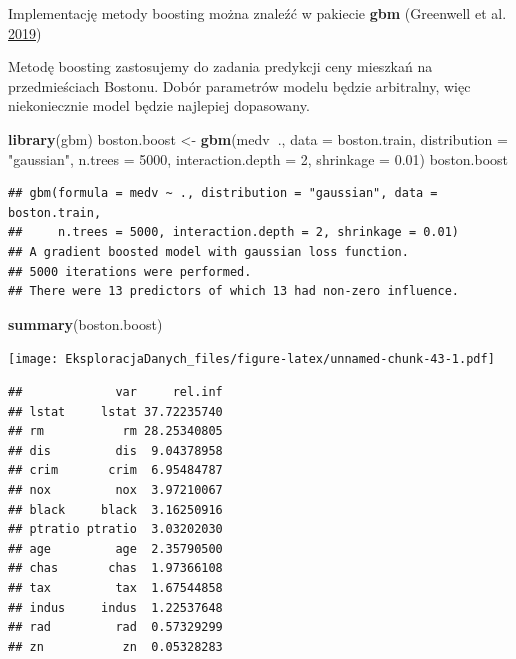 \documentclass[]{book}
\newenvironment{Shaded}{\begin{snugshade}}{\end{snugshade}}
\newcommand{\DataTypeTok}[1]{\textcolor[rgb]{0.13,0.29,0.53}{#1}}
\newcommand{\DecValTok}[1]{\textcolor[rgb]{0.00,0.00,0.81}{#1}}
\newcommand{\FloatTok}[1]{\textcolor[rgb]{0.00,0.00,0.81}{#1}}
\newcommand{\KeywordTok}[1]{\textcolor[rgb]{0.13,0.29,0.53}{\textbf{#1}}}
\newcommand{\NormalTok}[1]{#1}
\newcommand{\OperatorTok}[1]{\textcolor[rgb]{0.81,0.36,0.00}{\textbf{#1}}}
\newcommand{\StringTok}[1]{\textcolor[rgb]{0.31,0.60,0.02}{#1}}
\theoremstyle{plain}
\theoremstyle{definition}
\theoremstyle{definition}
\theoremstyle{definition}
\theoremstyle{definition}
\theoremstyle{remark}
\let\BeginKnitrBlock\begin \let\EndKnitrBlock\end
\begin{document}
Implementację metody boosting można znaleźć w pakiecie \textbf{gbm} (Greenwell et al. \protect\hyperlink{ref-R-gbm}{2019})

\BeginKnitrBlock{example}
\protect\hypertarget{exm:przyk53}{}{\label{exm:przyk53} }Metodę boosting zastosujemy do zadania predykcji ceny mieszkań na przedmieściach Bostonu. Dobór parametrów modelu będzie arbitralny, więc niekoniecznie model będzie najlepiej dopasowany.
\EndKnitrBlock{example}

\begin{Shaded}
\begin{Highlighting}[]
\KeywordTok{library}\NormalTok{(gbm)}
\NormalTok{boston.boost <-}\StringTok{ }\KeywordTok{gbm}\NormalTok{(medv}\OperatorTok{~}\NormalTok{., }\DataTypeTok{data =}\NormalTok{ boston.train,}
                    \DataTypeTok{distribution =} \StringTok{"gaussian"}\NormalTok{, }
                    \DataTypeTok{n.trees =} \DecValTok{5000}\NormalTok{,}
                    \DataTypeTok{interaction.depth =} \DecValTok{2}\NormalTok{,}
                    \DataTypeTok{shrinkage =} \FloatTok{0.01}\NormalTok{)}
\NormalTok{boston.boost}
\end{Highlighting}
\end{Shaded}

\begin{verbatim}
## gbm(formula = medv ~ ., distribution = "gaussian", data = boston.train, 
##     n.trees = 5000, interaction.depth = 2, shrinkage = 0.01)
## A gradient boosted model with gaussian loss function.
## 5000 iterations were performed.
## There were 13 predictors of which 13 had non-zero influence.
\end{verbatim}

\begin{Shaded}
\begin{Highlighting}[]
\KeywordTok{summary}\NormalTok{(boston.boost)}
\end{Highlighting}
\end{Shaded}

\texttt{[image: EksploracjaDanych\_files/figure-latex/unnamed-chunk-43-1.pdf]}

\begin{verbatim}
##             var     rel.inf
## lstat     lstat 37.72235740
## rm           rm 28.25340805
## dis         dis  9.04378958
## crim       crim  6.95484787
## nox         nox  3.97210067
## black     black  3.16250916
## ptratio ptratio  3.03202030
## age         age  2.35790500
## chas       chas  1.97366108
## tax         tax  1.67544858
## indus     indus  1.22537648
## rad         rad  0.57329299
## zn           zn  0.05328283
\end{verbatim}
\end{document}
